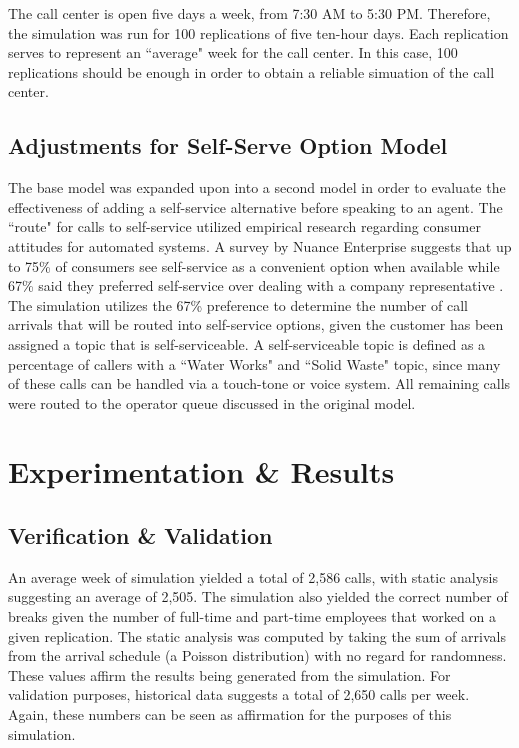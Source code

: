 \documentclass[12pt]{article}
\begin{document}
	 The call center is open five days a week, from 7:30 AM to 5:30 PM.  Therefore, the simulation was run for 100 replications of five ten-hour days.  Each replication serves to represent an ``average" week for the call center.  In this case, 100 replications should be enough in order to obtain a reliable simuation of the call center.
	 
	 
	\subsection{Adjustments for Self-Serve Option Model}
	
	The base model was expanded upon into a second model in order to evaluate the effectiveness of adding a self-service alternative before speaking to an agent.  The ``route" for calls to self-service utilized empirical research regarding consumer attitudes for automated systems.  A survey by Nuance Enterprise suggests that up to 75\% of consumers see self-service as a convenient option when available while 67\% said they preferred self-service over dealing with a company representative \cite{webblog}.  The simulation utilizes the 67\% preference to determine the number of call arrivals that will be routed into self-service options, given the customer has been assigned a topic that is self-serviceable.  A self-serviceable topic is defined as a percentage of callers with a ``Water Works" and ``Solid Waste" topic, since many of these calls can be handled via a touch-tone or voice system.  All remaining calls were routed to the operator queue discussed in the original model.

\section{Experimentation \& Results}

	\subsection{Verification \& Validation}
	
	  An average week of simulation yielded a total of 2,586 calls, with static analysis suggesting an average of 2,505.  The simulation also yielded the correct number of breaks given the number of full-time and part-time employees that worked on a given replication.  The static analysis was computed by taking the sum of arrivals from the arrival schedule (a Poisson distribution) with no regard for randomness.  These values affirm the results being generated from the simulation.  For validation purposes, historical data suggests a total of 2,650 calls per week.  Again, these numbers can be seen as affirmation for the purposes of this simulation.
	  
\end{document}
